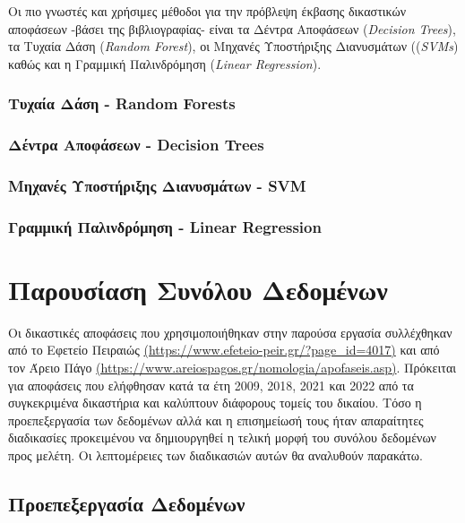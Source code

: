 \documentclass[diploma]{softlab-thesis}
\begin{document}
Οι πιο γνωστές και χρήσιμες μέθοδοι για την πρόβλεψη έκβασης δικαστικών αποφάσεων -βάσει της βιβλιογραφίας- είναι τα Δέντρα Αποφάσεων (\textit{Decision Trees}), τα Τυχαία Δάση (\textit{Random  Forest}), οι Μηχανές Υποστήριξης Διανυσμάτων ((\textit{SVMs}) καθώς και η Γραμμική Παλινδρόμηση (\textit{Linear Regression}). 

\subsection{Τυχαία Δάση - Random Forests}

\subsection{Δέντρα Αποφάσεων - Decision Trees}

\subsection{Μηχανές Υποστήριξης Διανυσμάτων - SVM}

\subsection{Γραμμική Παλινδρόμηση - Linear Regression}


\chapter{Παρουσίαση Συνόλου Δεδομένων}

\sloppy
Οι δικαστικές αποφάσεις που χρησιμοποιήθηκαν στην παρούσα εργασία συλλέχθηκαν από το Εφετείο Πειραιώς \href{https://www.efeteio-peir.gr/?page_id=4017}{(https://www.efeteio-peir.gr/?page_id=4017)} και από τον Άρειο Πάγο \href{https://www.areiospagos.gr/nomologia/apofaseis.asp}{(https://www.areiospagos.gr/nomologia/apofaseis.asp)}. 
Πρόκειται για αποφάσεις που ελήφθησαν κατά τα έτη 2009, 2018, 2021 και 2022 από τα συγκεκριμένα δικαστήρια και καλύπτουν διάφορους τομείς του δικαίου. Τόσο η προεπεξεργασία των δεδομένων αλλά και η επισημείωσή τους ήταν απαραίτητες διαδικασίες προκειμένου να δημιουργηθεί η τελική μορφή του συνόλου δεδομένων προς μελέτη. Οι λεπτομέρειες των διαδικασιών αυτών θα αναλυθούν παρακάτω.



\section{Προεπεξεργασία Δεδομένων}
\end{document}
